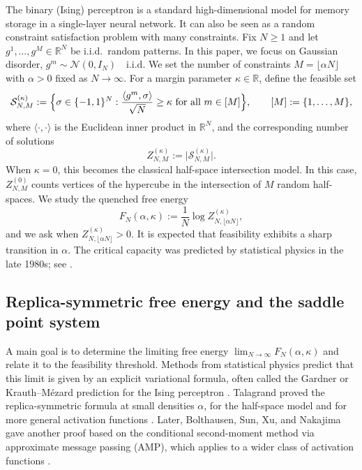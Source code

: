 \documentclass[11pt]{article}
\begin{document}
The binary (Ising) perceptron is a standard high-dimensional model for memory storage in a single-layer neural network. It can also be seen as a random constraint satisfaction problem with many constraints.
Fix $N\ge 1$ and let $g^1,\dots,g^M\in\mathbb R^N$ be i.i.d.\ random patterns. In this paper, we focus on Gaussian disorder,
\(
g^m \sim \mathcal N(0,I_N)\quad\text{i.i.d.}
\) 
We set the number of constraints $M=\lfloor \alpha N\rfloor$ with $\alpha>0$ fixed as $N\to\infty$.
For a margin parameter $\kappa\in\mathbb R$, define the feasible set
\[
\mathcal S_{N,M}^{(\kappa)}
:=
\Bigl\{
\sigma\in\{-1,1\}^N:
\frac{\langle g^m,\sigma\rangle}{\sqrt N}\ge \kappa
\ \text{for all } m\in[M]
\Bigr\},
\qquad [M]:=\{1,\dots,M\},
\]
where $\langle\cdot,\cdot\rangle$ is the Euclidean inner product in $\mathbb R^N$, and the corresponding number of solutions
\[
Z_{N,M}^{(\kappa)}
:=
\bigl|\mathcal S_{N,M}^{(\kappa)}\bigr|.
\]
When $\kappa=0$, this becomes the classical half-space intersection model. In this case, $Z_{N,M}^{(0)}$ counts vertices of the hypercube in the intersection of $M$ random half-spaces.
We study the quenched free energy 
\[
F_N(\alpha,\kappa)
:=
\frac{1}{N} \log Z_{N,\lfloor \alpha N\rfloor}^{(\kappa)},
\]
and we ask when $Z_{N,\lfloor \alpha N\rfloor}^{(\kappa)}>0$.
It is expected that feasibility exhibits a sharp transition in $\alpha$. The critical capacity was predicted by statistical physics in the late 1980s; see \cite{GardnerDerrida1988,KrauthMezard1989,Mezard1989}.


\subsection{Replica-symmetric free energy and the saddle point system}

A main goal is to determine the limiting free energy $\lim_{N\to\infty}F_N(\alpha,\kappa)$ and relate it to the feasibility threshold.
Methods from statistical physics predict that this limit is given by an explicit variational formula, often called the Gardner or Krauth--M\'ezard prediction for the Ising perceptron \cite{KrauthMezard1989,Mezard1989}.
Talagrand proved the replica-symmetric formula at small densities $\alpha$, for the half-space model and for more general activation functions \cite{Talagrand2000,Talagrand2011}.
Later, Bolthausen, Sun, Xu, and Nakajima gave another proof based on the conditional second-moment method via approximate message passing (AMP), which applies to a wider class of activation functions \cite{BolthausenNakajimaSunXu2022}.
\end{document}
